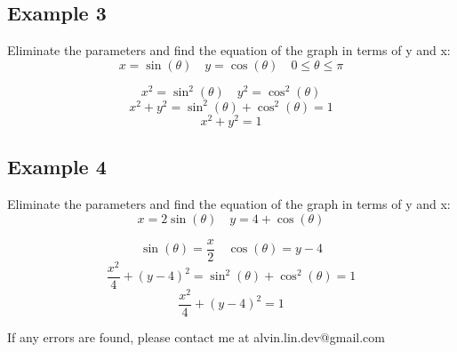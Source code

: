 \documentclass[letterpaper, 12pt]{article}
\begin{document}
\subsection*{Example 3}
Eliminate the parameters and find the equation of the graph in terms of y and x:
\[ x = \sin(\theta) \quad y = \cos(\theta) \quad 0 \leq \theta \leq \pi \]
\begin{center}
\end{center}
\[ x^{2} = \sin^{2}(\theta) \quad y^{2} = \cos^{2}(\theta) \]
\[ x^{2}+y^{2} = \sin^{2}(\theta)+\cos^{2}(\theta) = 1 \]
\[ x^{2}+y^{2} = 1 \]

\subsection*{Example 4}
Eliminate the parameters and find the equation of the graph in terms of y and x:
\[ x = 2\sin(\theta) \quad y = 4+\cos(\theta) \]
\begin{center}
\end{center}
\[ \sin(\theta) = \frac{x}{2} \quad \cos(\theta) = y-4 \]
\[ \frac{x^{2}}{4}+(y-4)^{2} = \sin^{2}(\theta)+\cos^{2}(\theta) = 1 \]
\[ \frac{x^{2}}{4}+(y-4)^{2} = 1 \]

\begin{center}
  If any errors are found, please contact me at alvin.lin.dev@gmail.com
\end{center}
\end{document}
